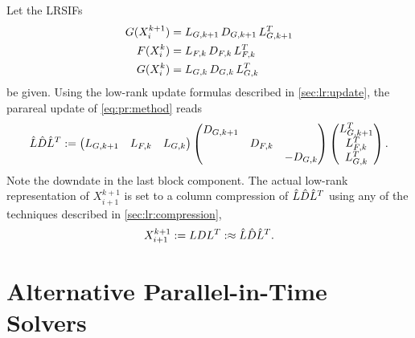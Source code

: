 Let the \acp{LRSIF}
\begin{equation}
\begin{aligned}
  G(X^{k+1}_i) &= \mathop{L_{G,k+1}} \mathop{D_{G,k+1}} \mathop{L_{G,k+1}^T} \\
  F(X^k_i)     &= \mathop{L_{F,k}}   \mathop{D_{F,k}}   \mathop{L_{F,k}^T} \\
  G(X^k_i)     &= \mathop{L_{G,k}}   \mathop{D_{G,k}}   \mathop{L_{G,k}^T}
\end{aligned}
\end{equation}
be given.
Using the low-rank update formulas described in \autoref{sec:lr:update},
the parareal update of \eqref{eq:pr:method} reads
\begin{equation}
  \hat L \hat D \hat L^T :=
  \begin{pmatrix}
    L_{G,k+1} &
    L_{F,k} &
    L_{G,k}
  \end{pmatrix}
  \begin{pmatrix}
    D_{G,k+1} \\
    & D_{F,k} \\
    && -D_{G,k}
  \end{pmatrix}
  \begin{pmatrix}
    L_{G,k+1}^T \\
    L_{F,k}^T \\
    L_{G,k}^T
  \end{pmatrix}
  .
\end{equation}
Note the downdate in the last block component.
The actual low-rank representation of $X^{k+1}_{i+1}$ is set to a column compression of $\hat L \hat D \hat L^T$
using any of the techniques described in \autoref{sec:lr:compression},
\begin{equation}
  X^{k+1}_{i+1}
  := LDL^T
  :\approx \hat L \hat D \hat L^T
  .
\end{equation}


\section{Alternative Parallel-in-Time Solvers}
\label{sec:pr:alternatives}
